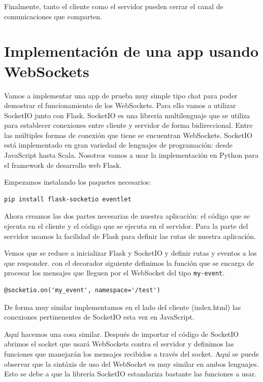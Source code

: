 \documentclass[12pt,a4paper]{article}
\def\code#1{\texttt{#1}}
\begin{document}
Finalmente, tanto el cliente como el servidor pueden cerrar el canal de comunicaciones que comparten.

\section{Implementación de una app usando WebSockets}


Vamos a implementar una app de prueba muy simple tipo chat para poder demostrar el funcionamiento de los WebSockets. Para ello vamos a utilizar SocketIO junto con Flask. SocketIO es una librería multilenguaje que se utiliza para establecer conexiones entre cliente y servidor de forma bidireccional. Entre las múltiples formas de conexión que tiene se encuentran WebSockets. SocketIO está implementado en gran variedad de lenguajes de programación: desde JavaScript hasta Scala. Nosotros vamos a usar la implementación en Python para el framework de desarrollo web Flask.

Empezamos instalando los paquetes necesarios:

\begin{lstlisting}
pip install flask-socketio eventlet
\end{lstlisting}

Ahora creamos las dos partes necesarias de nuestra aplicación: el código que se ejecuta en el cliente y el código que se ejecuta en el servidor. Para la parte del servidor usamos la facilidad de Flask para definir las rutas de nuestra aplicación.



Vemos que se reduce a inicializar Flask y SocketIO y definir rutas y eventos a los que responder. con el decorador siguiente definimos la función que se encarga de procesar los mensajes que lleguen por el WebSocket del tipo \code{my-event}.
\begin{lstlisting}[style=customc]
@socketio.on('my_event', namespace='/test')
\end{lstlisting}

De forma muy similar implementamos en el lado del cliente (index.html) las conexiones pertinenentes de SocketIO esta vez en JavaScript.



Aquí hacemos una cosa similar. Después de importar el código de SocketIO abrimos el socket que usará WebSockets contra el servidor y definimos las funciones que manejarán los mensajes recibidos a través del socket. Aquí se puede observar que la sintáxis de uso del WebSocket es muy similar en ambos lenguajes. Esto se debe a que la librería SocketIO estandariza bastante las funciones a usar.
\end{document}
